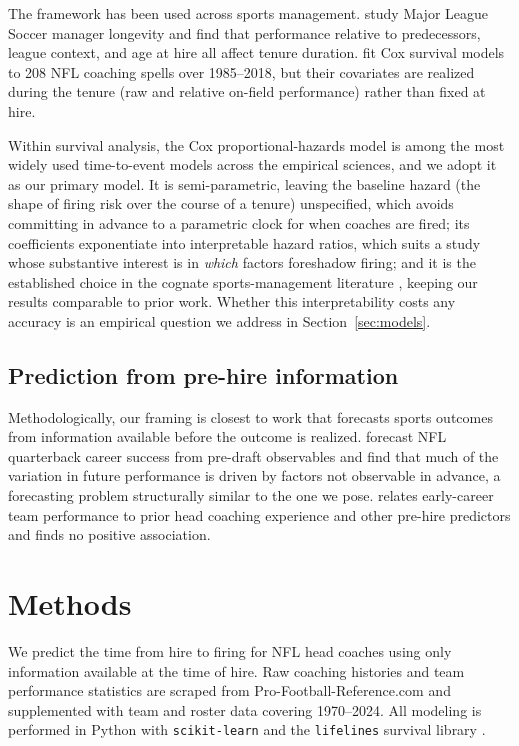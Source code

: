 \documentclass[USenglish]{article}
\theoremstyle{dgthm}
\theoremstyle{dgdef}
\begin{document}
The framework has been used across sports management. \citet{gilfix2020} study Major League Soccer manager longevity and find that performance relative to predecessors, league context, and age at hire all affect tenure duration. \citet{salaga2020} fit Cox survival models to 208 NFL coaching spells over 1985--2018, but their covariates are realized during the tenure (raw and relative on-field performance) rather than fixed at hire.

Within survival analysis, the Cox proportional-hazards model \citep{cox1972} is among the most widely used time-to-event models across the empirical sciences, and we adopt it as our primary model. It is semi-parametric, leaving the baseline hazard (the shape of firing risk over the course of a tenure) unspecified, which avoids committing in advance to a parametric clock for when coaches are fired; its coefficients exponentiate into interpretable hazard ratios, which suits a study whose substantive interest is in \emph{which} factors foreshadow firing; and it is the established choice in the cognate sports-management literature \citep{salaga2020, gilfix2020}, keeping our results comparable to prior work. Whether this interpretability costs any accuracy is an empirical question we address in Section~\ref{sec:models}.

\subsection{Prediction from pre-hire information}

Methodologically, our framing is closest to work that forecasts sports outcomes from information available before the outcome is realized. \citet{wolfson2011} forecast NFL quarterback career success from pre-draft observables and find that much of the variation in future performance is driven by factors not observable in advance, a forecasting problem structurally similar to the one we pose. \citet{roach2016} relates early-career team performance to prior head coaching experience and other pre-hire predictors and finds no positive association.

\section{Methods}

We predict the time from hire to firing for NFL head coaches using only information available at the time of hire. Raw coaching histories and team performance statistics are scraped from Pro-Football-Reference.com \citep{pfr} and supplemented with team and roster data covering 1970--2024. All modeling is performed in Python with \texttt{scikit-learn} \citep{pedregosa2011} and the \texttt{lifelines} survival library \citep{davidsonpilon2019}.
\end{document}
